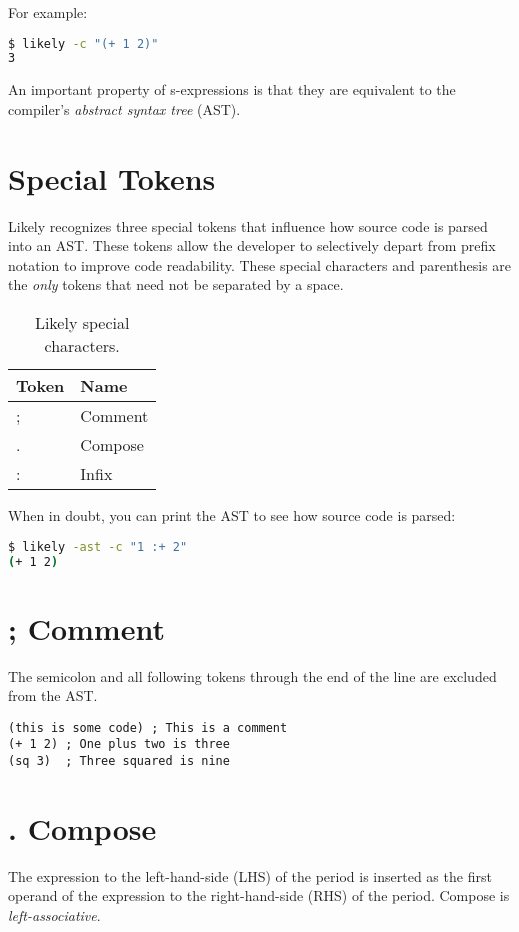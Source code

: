 \documentclass[numbers=noenddot]{scrbook}
\begin{document}
For example:

\begin{lstlisting}[language=bash, caption={Prefix notation example.}, captionpos=b]
$ likely -c "(+ 1 2)"
3
\end{lstlisting}

An important property of s-expressions is that they are equivalent to the compiler's \emph{abstract syntax tree} (AST).

\section{Special Tokens}
Likely recognizes three special tokens that influence how source code is parsed into an AST.
These tokens allow the developer to selectively depart from prefix notation to improve code readability.
These special characters and parenthesis are the \emph{only} tokens that need not be separated by a space.

\begin{table}[h]
\centering
\begin{tabular}{@{} l l @{}}
\toprule
Token & Name    \\ \midrule
;     & Comment \\
.     & Compose \\
:     & Infix   \\
\bottomrule
\end{tabular}
\caption{Likely special characters.}
\end{table}

When in doubt, you can print the AST to see how source code is parsed:
\begin{lstlisting}[language=bash, caption={Printing the abstract syntax tree.}, captionpos=b]
$ likely -ast -c "1 :+ 2"
(+ 1 2)
\end{lstlisting}

\section{; Comment}
The semicolon and all following tokens through the end of the line are excluded from the AST.

\begin{verbatim}
(this is some code) ; This is a comment
(+ 1 2) ; One plus two is three
(sq 3)  ; Three squared is nine
\end{verbatim}

\section{. Compose}
The expression to the left-hand-side (LHS) of the period is inserted as the first operand of the expression to the right-hand-side (RHS) of the period.
Compose is \emph{left-associative}.
\end{document}
